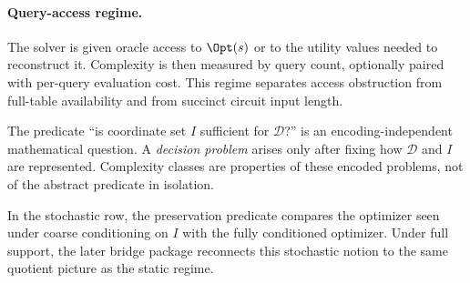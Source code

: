 \paragraph{Query-access regime.}
The solver is given oracle access to $\Opt(s)$ or to the utility values needed to reconstruct it. Complexity is then measured by query count, optionally paired with per-query evaluation cost. This regime separates access obstruction from full-table availability and from succinct circuit input length.

\begin{remark}\label{rem:question-vs-problem}
The predicate ``is coordinate set $I$ sufficient for $\mathcal{D}$?'' is an encoding-independent mathematical question. A \emph{decision problem} arises only after fixing how $\mathcal{D}$ and $I$ are represented. Complexity classes are properties of these encoded problems, not of the abstract predicate in isolation.
\end{remark}

\begin{remark}
In the stochastic row, the preservation predicate compares the optimizer seen under coarse conditioning on $I$ with the fully conditioned optimizer. Under full support, the later bridge package reconnects this stochastic notion to the same quotient picture as the static regime.
\end{remark}
